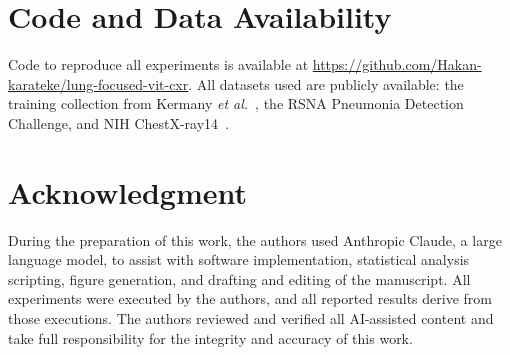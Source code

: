 \documentclass[journal,twoside,web]{ieeecolor}
\begin{document}
\section*{Code and Data Availability}

Code to reproduce all experiments is available at \href{https://github.com/Hakan-karateke/lung-focused-vit-cxr}{https://github.com/Hakan-karateke/lung-focused-vit-cxr}. All datasets used are publicly available: the training collection from Kermany \textit{et al.}~\cite{kermany2018}, the RSNA Pneumonia Detection Challenge, and NIH ChestX-ray14~\cite{wang2017}.

\section*{Acknowledgment}

During the preparation of this work, the authors used Anthropic Claude, a large language model, to assist with software implementation, statistical analysis scripting, figure generation, and drafting and editing of the manuscript. All experiments were executed by the authors, and all reported results derive from those executions. The authors reviewed and verified all AI-assisted content and take full responsibility for the integrity and accuracy of this work.
\end{document}
